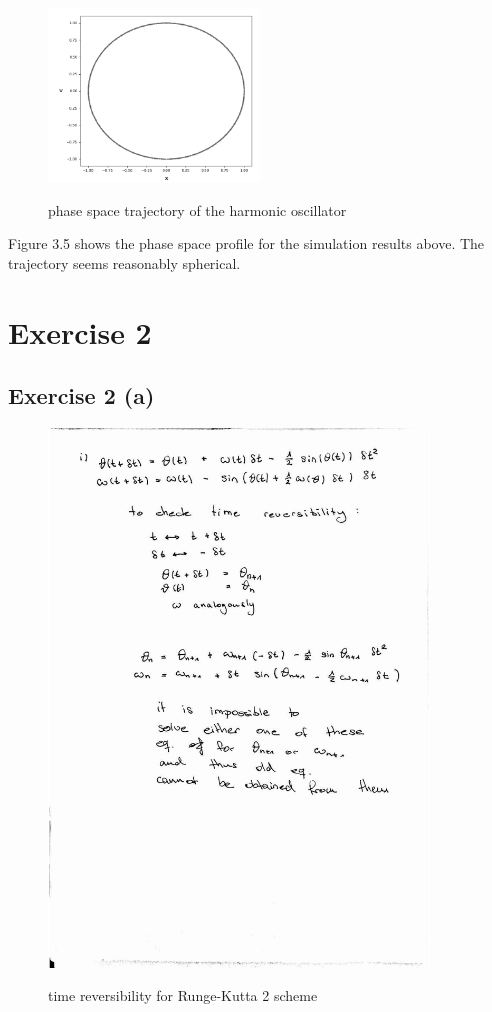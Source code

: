 \documentclass[12pt,a4paper]{article}	%
\begin{document}
\newpage

\begin{figure}[h!]		
\centering
{\includegraphics[width=0.5\textwidth]{1bphasespace.png}}		
\caption{phase space trajectory of the harmonic oscillator}
\end{figure}

Figure 3.5 shows the phase space profile for the simulation results above. The trajectory seems reasonably spherical. 

\newpage

\section{Exercise 2}
\subsection{Exercise 2 (a)}

\begin{figure}[h!]		
\centering
{\includegraphics[width=0.9\textwidth]{3_2_a1.jpg}}		
\caption{time reversibility for Runge-Kutta 2 scheme}
\end{figure}
\end{document}
